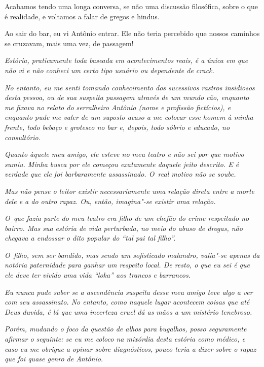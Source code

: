 Acabamos tendo uma longa conversa, se não uma discussão filosófica, sobre
o que é realidade, e voltamos a falar de gregos e hindus.

Ao sair do bar, eu vi Antônio entrar. Ele não teria percebido que nossos
caminhos se cruzavam, mais uma vez, de passagem!

\begin{center}\asterisc{}\end{center}


\emph{Estória, praticamente toda baseada em acontecimentos reais, é a
única em que não vi e não conheci um certo tipo usuário ou dependente de
crack.}~

\emph{No entanto, eu me senti tomando conhecimento dos sucessivos
rastros insidiosos desta pessoa, ou de sua suspeita passagem através de
um mundo cão, enquanto me fixava no relato do serralheiro Antônio (nome
e profissão fictícios), e enquanto pude me valer de um suposto acaso a
me colocar esse homem à minha frente, todo bebaço e grotesco no bar e,
depois, todo sóbrio e educado, no consultório.}~

\emph{Quanto àquele meu amigo, ele esteve no meu teatro e não sei por
que motivo sumiu. Minha busca por ele começou exatamente daquele jeito
descrito. E é verdade que ele foi barbaramente assassinado. O~real
motivo não se soube.}~

\emph{Mas não pense o leitor existir necessariamente uma relação direta
entre a morte dele e a do outro rapaz. Ou, então, imagina"-se existir uma
relação.}~

\emph{O~que fazia parte do meu teatro era filho de um chefão do crime
respeitado no bairro. Mas sua estória de vida perturbada, no meio do
abuso de drogas, não chegava a endossar o dito popular do ``tal pai tal
filho''.}~

\emph{O~filho, sem ser bandido, mas sendo um sofisticado malandro,
valia"-se apenas da notória paternidade para ganhar um respeito local. De
resto, o que eu sei é que ele deve ter vivido uma vida ``loka'' aos
trancos e barrancos.}~

\emph{Eu nunca pude saber se a ascendência suspeita desse meu amigo teve
algo a ver com seu assassinato. No entanto, como naquele lugar acontecem
coisas que até Deus duvida, é lá que uma incerteza cruel dá as mãos a um
mistério tenebroso.}~

\emph{Porém, mudando o foco da questão de alhos para bugalhos, posso
seguramente afirmar o seguinte: se eu me coloco na mixórdia desta
estória como médico, e caso eu me obrigue a opinar sobre diagnósticos,
pouco teria a dizer sobre o rapaz que foi quase genro de Antônio.}~

